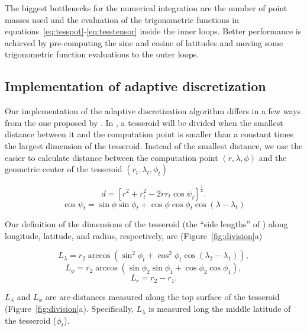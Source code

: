 \documentclass[paper,twocolumn,twoside]{geophysics}
\begin{document}
The biggest bottlenecks for the numerical integration are
the number of point masses used
and the evaluation of the trigonometric functions in
equations~\ref{eq:tesspot}-\ref{eq:tesstensor} inside the inner loops.
Better performance is achieved
by pre-computing the sine and cosine of latitudes
and moving some trigonometric function evaluations
to the outer loops.


\subsection{Implementation of adaptive discretization}

Our implementation of the adaptive discretization algorithm
differs in a few ways from the one proposed by \citet{Li2011}.
In \citet{Li2011},
a tesseroid will be divided when
the smallest distance between it and the computation point
is smaller than a constant times
the largest dimension of the tesseroid.
Instead of the smallest distance,
we use the easier to calculate
distance between
the computation point $(r, \lambda, \phi)$
and the geometric center of the tesseroid
$(r_t, \lambda_t, \phi_t)$

\begin{equation}
    d = \left[
        r^2 + r_t^2 - 2 r r_t \cos\psi_t
        \right]^{\frac{1}{2}}.
    \label{eq:distance}
\end{equation}
\begin{equation}
    \cos\psi_t =
        \sin\phi\sin\phi_t + \cos\phi\cos\phi_t\cos(\lambda - \lambda_t)
\end{equation}

Our definition of the dimensions of the tesseroid
(the ``side lengths'' of \citet{Li2011})
along longitude, latitude, and radius, respectively, are
(Figure~\ref{fig:division}a)

\begin{equation}
    L_\lambda = r_2 \arccos(\sin^2\phi_t +
        \cos^2\phi_t\cos(\lambda_2 - \lambda_1)),
    \label{eq:sizelon}
\end{equation}
\begin{equation}
    L_\phi = r_2 \arccos(\sin\phi_2\sin\phi_1 + \cos\phi_2\cos\phi_1),
\end{equation}
\begin{equation}
    L_r = r_2 - r_1.
    \label{eq:sizer}
\end{equation}

\noindent
$L_\lambda$ and $L_\phi$ are arc-distances measured along the top surface of
the tesseroid (Figure~\ref{fig:division}a).
Specifically, $L_\lambda$ is measured long the middle latitude of the
tesseroid ($\phi_t$).
\end{document}
